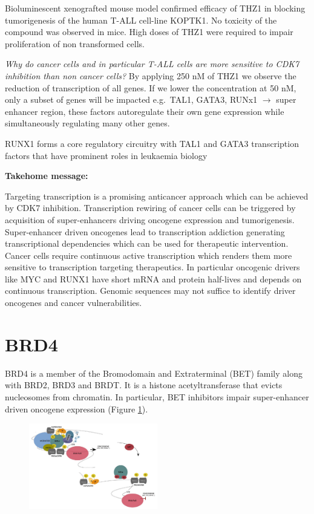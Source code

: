Bioluminescent xenografted mouse model confirmed efficacy of THZ1 in blocking tumorigenesis of the human T-ALL cell-line KOPTK1. No toxicity of the compound was observed in mice. High doses of THZ1 were required to impair proliferation of non transformed cells.

\emph{Why do cancer cells and in particular T-ALL cells are more sensitive to CDK7 inhibition than non cancer cells?} By applying 250 nM of THZ1 we observe the reduction of transcription of all genes. If we lower the concentration at 50 nM, only a subset of genes will be impacted e.g.~TAL1, GATA3, RUNx1 $\rightarrow$ super enhancer region, these factors autoregulate their own gene expression while simultaneously regulating many other genes.

 RUNX1 forms a core regulatory circuitry with TAL1 and GATA3 transcription factors that have prominent roles in leukaemia biology

\textbf{Takehome message:}

Targeting transcription is a promising anticancer approach which can be achieved by CDK7 inhibition. Transcription rewiring of cancer cells can be triggered by acquisition of super-enhancers driving oncogene expression and tumorigenesis. Super-enhancer driven oncogenes lead to transcription addiction generating transcriptional dependencies which can be used for therapeutic intervention. Cancer cells require continuous active transcription which renders them more sensitive to transcription targeting therapeutics. In particular oncogenic drivers like MYC and RUNX1 have short mRNA and protein half-lives and depends on continuous transcription. Genomic sequences may not suffice to identify driver oncogenes and cancer vulnerabilities.

\hypertarget{brd4}{%
\section{BRD4}\label{brd4}}

BRD4 is a member of the Bromodomain and Extraterminal (BET) family along
with BRD2, BRD3 and BRDT. It is a histone acetyltransferase that evicts nucleosomes from chromatin. In particular, BET inhibitors impair super-enhancer driven oncogene expression (Figure \ref{fig:brd4}).


\begin{figure}
\centering
\includegraphics[width=0.5\textwidth]{../_resources/Screen_Shot_2022-11-13_at_19-35-28.png}
\caption{}
\label{fig:brd4}
\end{figure}

